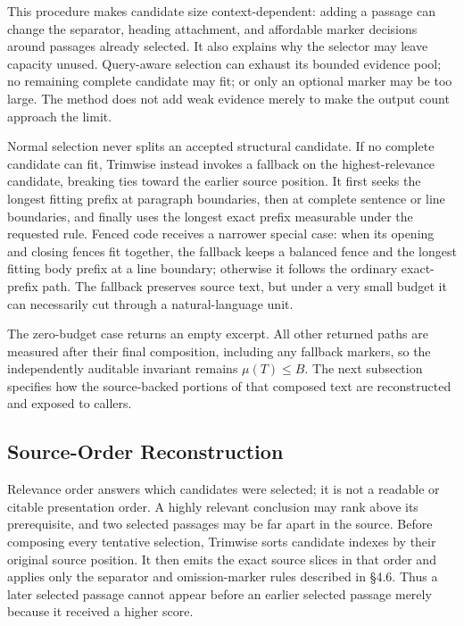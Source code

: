 \documentclass[
]{article}
\begin{document}
This procedure makes candidate size context-dependent: adding a passage
can change the separator, heading attachment, and affordable marker
decisions around passages already selected. It also explains why the
selector may leave capacity unused. Query-aware selection can exhaust
its bounded evidence pool; no remaining complete candidate may fit; or
only an optional marker may be too large. The method does not add weak
evidence merely to make the output count approach the limit.

Normal selection never splits an accepted structural candidate. If no
complete candidate can fit, Trimwise instead invokes a fallback on the
highest-relevance candidate, breaking ties toward the earlier source
position. It first seeks the longest fitting prefix at paragraph
boundaries, then at complete sentence or line boundaries, and finally
uses the longest exact prefix measurable under the requested rule.
Fenced code receives a narrower special case: when its opening and
closing fences fit together, the fallback keeps a balanced fence and the
longest fitting body prefix at a line boundary; otherwise it follows the
ordinary exact-prefix path. The fallback preserves source text, but
under a very small budget it can necessarily cut through a
natural-language unit.

The zero-budget case returns an empty excerpt. All other returned paths
are measured after their final composition, including any fallback
markers, so the independently auditable invariant remains
\(\mu(T)\leq B\). The next subsection specifies how the source-backed
portions of that composed text are reconstructed and exposed to callers.

\subsection{Source-Order
Reconstruction}\label{source-order-reconstruction}

Relevance order answers which candidates were selected; it is not a
readable or citable presentation order. A highly relevant conclusion may
rank above its prerequisite, and two selected passages may be far apart
in the source. Before composing every tentative selection, Trimwise
sorts candidate indexes by their original source position. It then emits
the exact source slices in that order and applies only the separator and
omission-marker rules described in §4.6. Thus a later selected passage
cannot appear before an earlier selected passage merely because it
received a higher score.
\end{document}
